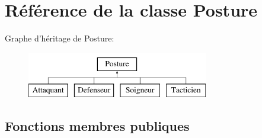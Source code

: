 \hypertarget{classPosture}{\section{Référence de la classe Posture}
\label{classPosture}
}
Graphe d'héritage de Posture\-:\begin{figure}[H]
\begin{center}
\leavevmode
\includegraphics[height=2.000000cm]{classPosture}
\end{center}
\end{figure}
\subsection*{Fonctions membres publiques}
